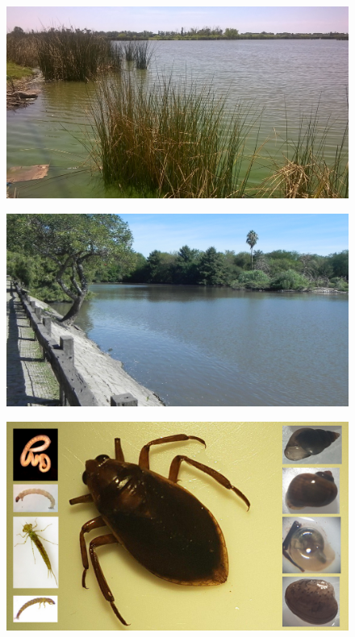 \documentclass[final]{beamer}
\newlength{\onecolwid}
\begin{document}
\begin{frame}[t]
\begin{columns}[t]
\begin{column}{\onecolwid}
\begin{block}{ }
                \begin{multicols}{2}
                \begin{figure}
                	\vspace*{-0.90cm}
                    \includegraphics[width=0.9\linewidth]{lp.jpg}
				\end{figure}
                \begin{figure}
                	\vspace*{-0.90cm}
                    \includegraphics[width=0.9\linewidth]{lpu.jpg}
				\end{figure}
                \end{multicols}
                
                \begin{figure}
                    \includegraphics[width=0.95\linewidth]{popu.jpg}
				\end{figure}
                

\end{block}
\end{column}
\end{columns}
\end{frame}
\end{document}
